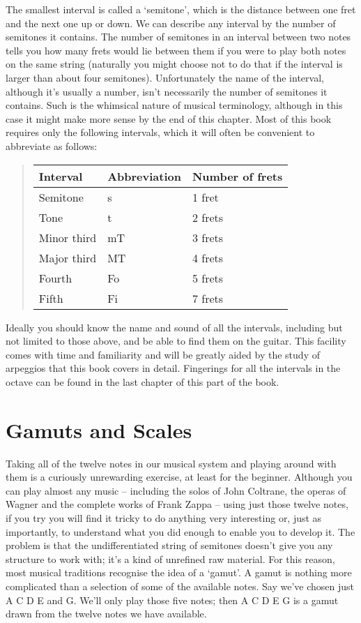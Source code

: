 \documentclass[english]{./gbook}
\begin{document}
\begin{large}
The smallest interval is called a `semitone', which is the distance between one fret and the next one up or down. We can describe any interval by the number of semitones it contains. The number of semitones in an interval between two notes tells you how many frets would lie between them if you were to play both notes on the same string (naturally you might choose not to do that if the interval is larger than about four semitones). Unfortunately the name of the interval, although it's usually a number, isn't necessarily the number of semitones it contains. Such is the whimsical nature of musical terminology, although in this case it might make more sense by the end of this chapter. Most of this book requires only the following intervals, which it will often be convenient to abbreviate as follows:
\begin{quote}
\begin{tabular}{lll}
	Interval & Abbreviation & Number of frets \\
	\hline Semitone & s & 1 fret \\
	Tone	& t & 2 frets \\
	Minor third & mT & 3 frets \\
	Major third & MT & 4 frets \\
	Fourth	& Fo & 5 frets \\
	Fifth	& Fi & 7 frets
\end{tabular}
\end{quote}
Ideally you should know the name and sound of all the intervals, including but not limited to those above, and be able to find them on the guitar. This facility comes with time and familiarity and will be greatly aided by the study of arpeggios that this book covers in detail. Fingerings for all the intervals in the octave can be found in the last chapter of this part of the book.

\section*{Gamuts and Scales}

Taking all of the twelve notes in our musical system and playing around with them is a curiously unrewarding exercise, at least for the beginner. Although you can play almost any music -- including the solos of John Coltrane, the operas of Wagner and the complete works of Frank Zappa -- using just those twelve notes, if you try you will find it tricky to do anything very interesting or, just as importantly, to understand what you did enough to enable you to develop it. The problem is that the undifferentiated string of semitones doesn't give you any structure to work with; it's a kind of unrefined raw material. For this reason, most musical traditions recognise the idea of a `gamut'. A gamut is nothing more complicated than a selection of some of the available notes. Say we've chosen just A C D E and G. We'll only play those five notes; then A C D E G is a gamut drawn from the twelve notes we have available.


\end{large}
\end{document}
